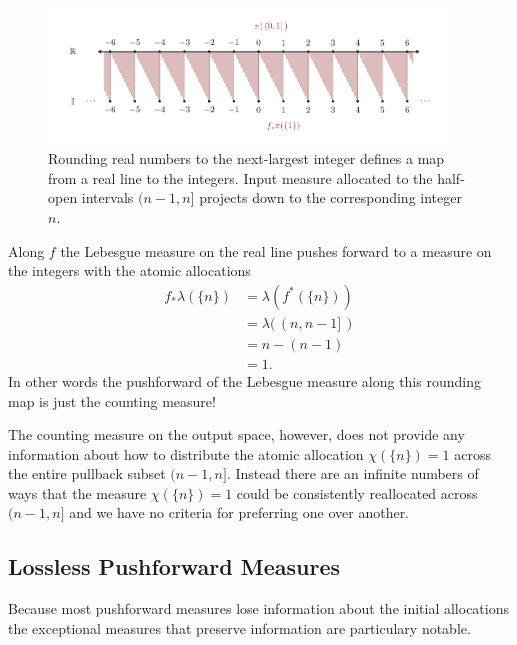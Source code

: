 \documentclass[
  letterpaper,
  DIV=11,
  numbers=noendperiod]{scrartcl}
\begin{document}
\begin{figure}

{\centering \includegraphics[width=0.95\textwidth,height=\textheight]{figures/line_to_integers/line_to_integers.pdf}

}

\caption{\label{fig-line-to-integers}Rounding real numbers to the
next-largest integer defines a map from a real line to the integers.
Input measure allocated to the half-open intervals \((n - 1, n]\)
projects down to the corresponding integer \(n\).}

\end{figure}

Along \(f\) the Lebesgue measure on the real line pushes forward to a
measure on the integers with the atomic allocations \begin{align*}
f_{*} \lambda( \{ n \} )
&=
\lambda( f^{*} ( \{ n \} ) )
\\
&=
\lambda( \, (n, n - 1] \, )
\\
&=
n - (n - 1)
\\
&=
1.
\end{align*} In other words the pushforward of the Lebesgue measure
along this rounding map is just the counting measure!

The counting measure on the output space, however, does not provide any
information about how to distribute the atomic allocation
\(\chi( \{ n \} ) = 1\) across the entire pullback subset
\((n - 1, n]\). Instead there are an infinite numbers of ways that the
measure \(\chi( \{ n \} ) = 1\) could be consistently reallocated across
\((n - 1, n]\) and we have no criteria for preferring one over another.

\hypertarget{lossless-pushforward-measures}{%
\subsection{Lossless Pushforward
Measures}\label{lossless-pushforward-measures}}

Because most pushforward measures lose information about the initial
allocations the exceptional measures that preserve information are
particulary notable.
\end{document}
